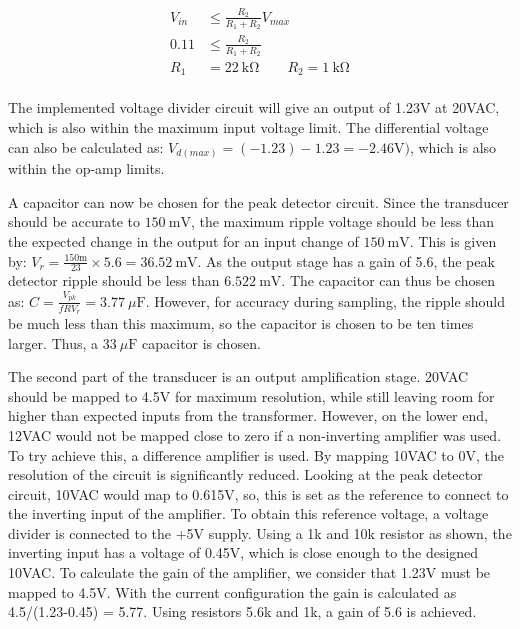 \begin{equation}
\begin{split}
    V_{in} &\leq \frac{R_2}{R_1 + R_2}V_{max} \\
    0.11 &\leq \frac{R_2}{R_1 + R_2} \\
    R_1 &= \SI{22}{\kilo\ohm}   \qquad R_2 = \SI{1}{\kilo\ohm} \\
\end{split}
\label{eqn:voltage_divider}
\end{equation}

The implemented voltage divider circuit will give an output of 1.23V at 20VAC, which is also within the maximum input voltage limit. The differential voltage can also be calculated as: $V_{d(max)} = (-1.23) - 1.23 = -2.46\si{\volt})$, which is also within the op-amp limits. 

A capacitor can now be chosen for the peak detector circuit. Since the transducer should be accurate to $\SI{150}{\milli\volt}$, the maximum ripple voltage should be less than the expected change in the output for an input change of $\SI{150}{\milli\volt}$. This is given by\cite{Neamen:Microelectronics}: $V_r = \frac{\si{150\milli}}{23} \times 5.6 = \SI{36.52}{\milli\volt}$. As the output stage has a gain of 5.6, the peak detector ripple should be less than $\SI{6.522}{\milli\volt}$. The capacitor can thus be chosen as: $C=\frac{V_{pk}}{fRV_r}=\SI{3.77}{\mu\farad}$. However, for accuracy during sampling, the ripple should be much less than this maximum, so the capacitor is chosen to be ten times larger. Thus, a $\SI{33}{\mu\farad}$ capacitor is chosen.

The second part of the transducer is an output amplification stage. 20VAC should be mapped to 4.5V for maximum resolution, while still leaving room for higher than expected inputs from the transformer. However, on the lower end, 12VAC would not be mapped close to zero if a non-inverting amplifier was used. To try achieve this, a difference amplifier is used. By mapping 10VAC to 0V, the resolution of the circuit is significantly reduced. Looking at the peak detector circuit, 10VAC would map to 0.615V, so, this is set as the reference to connect to the inverting input of the amplifier. To obtain this reference voltage, a voltage divider is connected to the +5V supply. Using a 1k and 10k resistor as shown, the inverting input has a voltage of 0.45V, which is close enough to the designed 10VAC. To calculate the gain of the amplifier, we consider that 1.23V must be mapped to 4.5V. With the current configuration the gain is calculated as 4.5/(1.23-0.45) = 5.77. Using resistors 5.6k and 1k, a gain of 5.6 is achieved.

